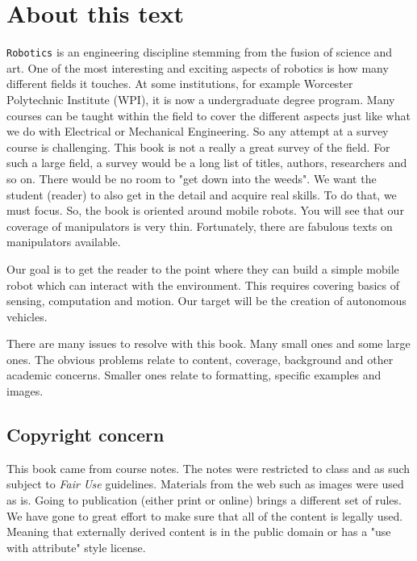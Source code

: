 \hypertarget{about-this-text}{%
\section{About this text}\label{about-this-text}}

\texttt{Robotics} is an engineering discipline stemming from the fusion
of science and art. One of the most interesting and exciting aspects of
robotics is how many different fields it touches. At some institutions,
for example Worcester Polytechnic Institute (WPI), it is now a
undergraduate degree program. Many courses can be taught within the
field to cover the different aspects just like what we do with
Electrical or Mechanical Engineering. So any attempt at a survey course
is challenging. This book is not a really a great survey of the field.
For such a large field, a survey would be a long list of titles,
authors, researchers and so on. There would be no room to "get down into
the weeds". We want the student (reader) to also get in the detail and
acquire real skills. To do that, we must focus. So, the book is oriented
around mobile robots. You will see that our coverage of manipulators is
very thin. Fortunately, there are fabulous texts on manipulators
available.

Our goal is to get the reader to the point where they can build a simple
mobile robot which can interact with the environment. This requires
covering basics of sensing, computation and motion. Our target will be
the creation of autonomous vehicles.

There are many issues to resolve with this book. Many small ones and
some large ones. The obvious problems relate to content, coverage,
background and other academic concerns. Smaller ones relate to
formatting, specific examples and images.

\hypertarget{copyright-concern}{%
\subsection{Copyright concern}\label{copyright-concern}}

This book came from course notes. The notes were restricted to class and
as such subject to \emph{Fair Use} guidelines. Materials from the web
such as images were used as is. Going to publication (either print or
online) brings a different set of rules. We have gone to great effort to
make sure that all of the content is legally used. Meaning that
externally derived content is in the public domain or has a "use with
attribute" style license.


